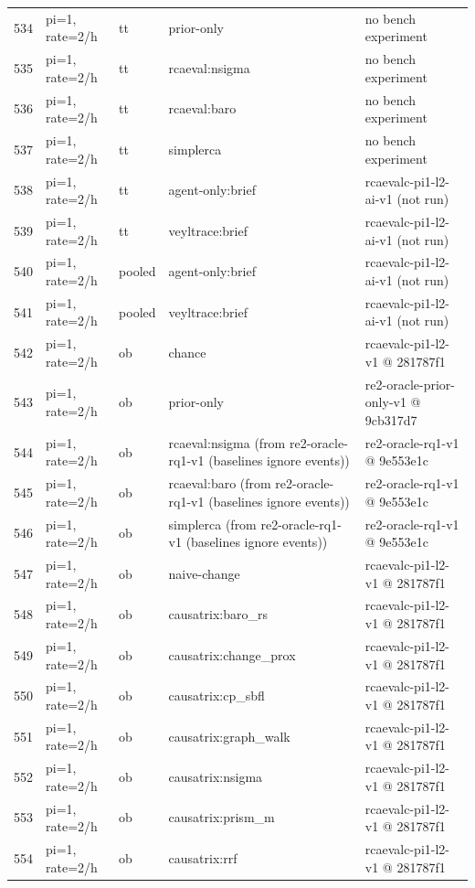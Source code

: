 \begin{longtable}{@{}r>{\raggedright\arraybackslash}p{48.0pt}>{\raggedright\arraybackslash}p{18.0pt}>{\raggedright\arraybackslash}p{108.0pt}>{\raggedright\arraybackslash}p{105.0pt}@{}}
534 & pi=1, rate=2/h & tt & prior-only & no bench experiment \\
535 & pi=1, rate=2/h & tt & rcaeval:nsigma & no bench experiment \\
536 & pi=1, rate=2/h & tt & rcaeval:baro & no bench experiment \\
537 & pi=1, rate=2/h & tt & simplerca & no bench experiment \\
538 & pi=1, rate=2/h & tt & agent-only:brief & rcaevalc-pi1-l2-ai-v1 (not run) \\
539 & pi=1, rate=2/h & tt & veyltrace:brief & rcaevalc-pi1-l2-ai-v1 (not run) \\
540 & pi=1, rate=2/h & pooled & agent-only:brief & rcaevalc-pi1-l2-ai-v1 (not run) \\
541 & pi=1, rate=2/h & pooled & veyltrace:brief & rcaevalc-pi1-l2-ai-v1 (not run) \\
542 & pi=1, rate=2/h & ob & chance & rcaevalc-pi1-l2-v1 @ 281787f1 \\
543 & pi=1, rate=2/h & ob & prior-only & re2-oracle-prior-only-v1 @ 9cb317d7 \\
544 & pi=1, rate=2/h & ob & rcaeval:nsigma (from re2-oracle-rq1-v1 (baselines ignore events)) & re2-oracle-rq1-v1 @ 9e553e1c \\
545 & pi=1, rate=2/h & ob & rcaeval:baro (from re2-oracle-rq1-v1 (baselines ignore events)) & re2-oracle-rq1-v1 @ 9e553e1c \\
546 & pi=1, rate=2/h & ob & simplerca (from re2-oracle-rq1-v1 (baselines ignore events)) & re2-oracle-rq1-v1 @ 9e553e1c \\
547 & pi=1, rate=2/h & ob & naive-change & rcaevalc-pi1-l2-v1 @ 281787f1 \\
548 & pi=1, rate=2/h & ob & causatrix:baro\_rs & rcaevalc-pi1-l2-v1 @ 281787f1 \\
549 & pi=1, rate=2/h & ob & causatrix:change\_prox & rcaevalc-pi1-l2-v1 @ 281787f1 \\
550 & pi=1, rate=2/h & ob & causatrix:cp\_sbfl & rcaevalc-pi1-l2-v1 @ 281787f1 \\
551 & pi=1, rate=2/h & ob & causatrix:graph\_walk & rcaevalc-pi1-l2-v1 @ 281787f1 \\
552 & pi=1, rate=2/h & ob & causatrix:nsigma & rcaevalc-pi1-l2-v1 @ 281787f1 \\
553 & pi=1, rate=2/h & ob & causatrix:prism\_m & rcaevalc-pi1-l2-v1 @ 281787f1 \\
554 & pi=1, rate=2/h & ob & causatrix:rrf & rcaevalc-pi1-l2-v1 @ 281787f1 \\

\end{longtable}
